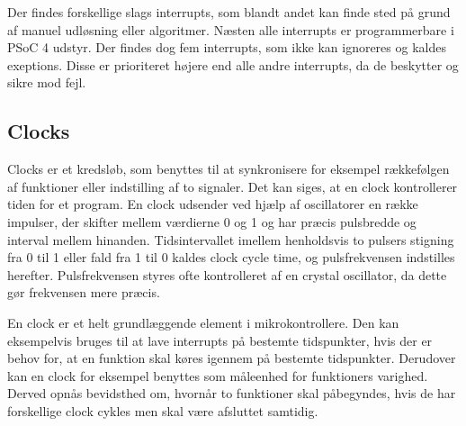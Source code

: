 Der findes forskellige slags interrupts, som blandt andet kan finde sted på grund af manuel udløsning eller algoritmer. Næsten alle interrupts er programmerbare i PSoC 4 udstyr. Der findes dog fem interrupts, som ikke kan ignoreres og kaldes exeptions. Disse er prioriteret højere end alle andre interrupts, da de beskytter og sikre mod fejl. \citep{Badiger2016}

\subsection{Clocks}
Clocks er et kredsløb, som benyttes til at synkronisere for eksempel rækkefølgen af funktioner eller indstilling af to signaler. Det kan siges, at en clock kontrollerer tiden for et program. En clock udsender ved hjælp af oscillatorer en række impulser, der skifter mellem værdierne 0 og 1 og har præcis pulsbredde og interval mellem hinanden. Tidsintervallet imellem henholdsvis to pulsers stigning fra 0 til 1 eller fald fra 1 til 0 %
kaldes clock cycle time, og pulsfrekvensen indstilles herefter. Pulsfrekvensen styres ofte kontrolleret af en crystal oscillator, da dette gør frekvensen mere præcis. \citep{Tanenbaum2006}

En clock er et helt grundlæggende element i mikrokontrollere. Den kan eksempelvis bruges til at lave interrupts på bestemte tidspunkter, hvis der er behov for, at en funktion skal køres igennem på bestemte tidspunkter. Derudover kan en clock for eksempel benyttes som måleenhed for funktioners varighed. Derved opnås bevidsthed om, hvornår to funktioner skal påbegyndes, hvis de har forskellige clock cykles men skal være afsluttet samtidig. \citep{Tanenbaum2006}

